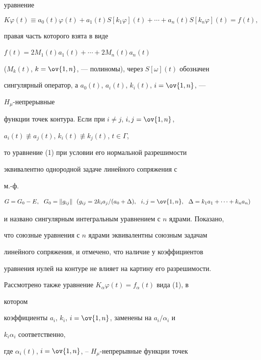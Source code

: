 уравнение 


\begin{equation} 


K\varphi(t)\equiv a_0(t)\varphi(t)+a_1(t)S[k_1\varphi](t)+ 


\dotsb+a_n(t)S[k_n\varphi](t)=f(t), 


\end{equation} 


правая часть которого взята в виде 


$f(t)=2M_1(t)a_1(t)+\dotsb+2M_n(t)a_n(t)$ 


($M_k(t)$, $k=\ov{1,n}$, --- полиномы), через $S[\omega](t)$ обозначен 


сингулярный оператор, а $a_0(t)$, $a_i(t)$, $k_i(t)$, $i=\ov{1,n}$, --- 


$H_\mu$-непрерывные 


функции точек контура. Если при $i\ne j$, $i,j=\ov{1,n}$, 


$a_i(t)\not\equiv a_j(t)$, $k_i(t)\not\equiv k_j(t)$, $t\in\Gamma$, 


то уравнение (1) при условии его нормальной разрешимости 


эквивалентно однородной задаче линейного сопряжения с 


м.-ф. 


\begin{equation} 


G=G_0-E,\ \ G_0=\|g_{i j}\|\ \ (g_{i j}=2k_i a_j/ 


(a_0+\Delta),\ \ i,j=\ov{1,n}, \ \ \Delta=k_1a_1+\dotsb+ 


k_n a_n) 


\end{equation} 


и названо сингулярным интегральным уравнением с $n$ ядрами. Показано, 


что союзные уравнения с $n$ ядрами эквивалентны союзным задачам 


линейного сопряжения, и отмечено, что наличие у коэффициентов 


уравнения нулей на контуре не влияет на картину его разрешимости. 


Рассмотрено также уравнение $K_\alpha\varphi(t)=f_\alpha(t)$ вида (1), в 


котором 


коэффициенты $a_i$, $k_i$, $i=\ov{1,n}$, заменены на $a_i/\alpha_i$ и 


$k_i\alpha_i$ соответственно, 


где $\alpha_i(t)$, $i=\ov{1,n}$, -- $H_\mu$-непрерывные функции точек 


